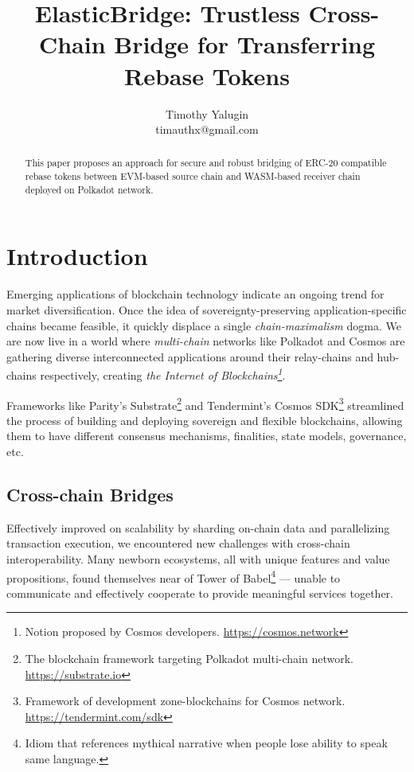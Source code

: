 \documentclass{article}
\title{ElasticBridge: Trustless Cross-Chain Bridge for Transferring Rebase Tokens}
\author{Timothy Yalugin\\timauthx@gmail.com}
\begin{document}
\maketitle

\begin{abstract}

This paper proposes an approach for secure and robust bridging of ERC-20 compatible rebase tokens between EVM-based source chain and WASM-based receiver chain deployed on Polkadot network.

\end{abstract}

\section{Introduction}

Emerging applications of blockchain technology indicate an ongoing trend for market diversification. Once the idea of sovereignty-preserving application-specific chains became feasible, it quickly displace a single \textit{chain-maximalism} dogma. We are now live in a world where \textit{multi-chain} networks like Polkadot \cite{wood2016polkadot} and Cosmos \cite{kwon2016cosmos} are gathering diverse interconnected applications around their relay-chains and hub-chains respectively, creating \textit{the Internet of Blockchains\footnote{Notion proposed by Cosmos developers. \url{https://cosmos.network}}}.

Frameworks like Parity's Substrate\footnote{The blockchain framework
targeting Polkadot multi-chain network. \url{https://substrate.io}} and Tendermint's Cosmos SDK\footnote{Framework of development zone-blockchains for Cosmos network. \url{https://tendermint.com/sdk}} streamlined the process of building and deploying sovereign and flexible blockchains, allowing them to have different consensus mechanisms, finalities, state models, governance, etc.

\subsection{Cross-chain Bridges}

Effectively improved on scalability by sharding on-chain data and parallelizing transaction execution, we encountered new challenges with cross-chain interoperability. Many newborn ecosystems, all with unique features and value propositions, found themselves near of Tower of Babel\footnote{Idiom that references mythical narrative when people lose ability to speak same language. } --- unable to communicate and effectively cooperate to provide meaningful services together.
\end{document}

